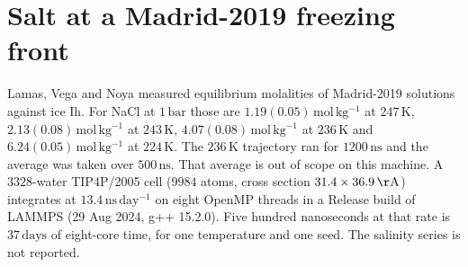 


\section{Salt at a Madrid-2019 freezing front}
\label{sec:brine-science}

Lamas, Vega and Noya measured equilibrium molalities of Madrid-2019
solutions against ice Ih.\cite{lamas2022}
For NaCl at $1\,\mathrm{bar}$ those are
$1.19(0.05)\,\mathrm{mol\,kg^{-1}}$ at $247\,\mathrm{K}$,
$2.13(0.08)\,\mathrm{mol\,kg^{-1}}$ at $243\,\mathrm{K}$,
$4.07(0.08)\,\mathrm{mol\,kg^{-1}}$ at $236\,\mathrm{K}$ and
$6.24(0.05)\,\mathrm{mol\,kg^{-1}}$ at $224\,\mathrm{K}$.
The $236\,\mathrm{K}$ trajectory ran for $1200\,\mathrm{ns}$ and the
average was taken over $500\,\mathrm{ns}$.
That average is out of scope on this machine.
A $3328$-water TIP4P/2005 cell ($9984$ atoms, cross section
$31.4\times 36.9\,\mathrm{\AA}$) integrates at
$13.4\,\mathrm{ns\,day^{-1}}$ on eight OpenMP threads in a Release
build of LAMMPS (29 Aug 2024, g++ 15.2.0).
Five hundred nanoseconds at that rate is $37\,\mathrm{days}$ of
eight-core time, for one temperature and one seed.
The salinity series is not reported.

